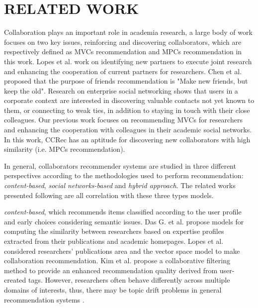 \documentclass[review]{elsarticle}
\begin{document}
\section{RELATED WORK}
Collaboration plays an important role in academia research, a large body of work focuses on two key issues, reinforcing and discovering collaborators, which are respectively defined as MVCs recommendation and MPCs recommendation in this work. Lopes et al. \cite{lopes2010collaboration} work on identifying new partners to execute joint research and enhancing the cooperation of current partners for researchers. Chen et al. \cite{chen2009make} proposed that the purpose of friends recommendation is "Make new friends, but keep the old". Research on enterprise social networking \cite{dimicco2008motivations} shows that users in a corporate context are interested in discovering valuable contacts not yet known to them, or connecting to weak ties, in addition to staying in touch with their close colleagues. Our previous work \cite{li2014acrec} focuses on recommending MVCs for researchers and enhancing the cooperation with colleagues in their academic social networks. In this work, CCRec has an aptitude for discovering new collaborators with high similarity (i.e. MPCs recommendation).

In general, collaborators recommender systems are studied in three different perspectives according to the methodologies used to perform recommendation: \emph{content-based}, \emph{social networks-based} and \emph{hybrid approach}. The related works presented following are all correlation with these three types models.

\emph{content-based}, which recommends items classified according to the user profile and early choices considering semantic issues. Das G. et al. \cite{gollapalli2012similar} propose models for computing the similarity between researchers based on expertise profiles extracted from their publications and academic homepages. Lopes et al. \cite{lopes2010collaboration} considered researchers' publications area and the vector space model to make collaboration recommendation. Kim et al. \cite{kim2010collaborative} propose a collaborative filtering method to provide an enhanced recommendation quality derived from user-created tags. However, researchers often behave differently across multiple domains of interests, thus, there may be topic drift problems in general recommendation systems \cite{tang2012cross}.
\end{document}
